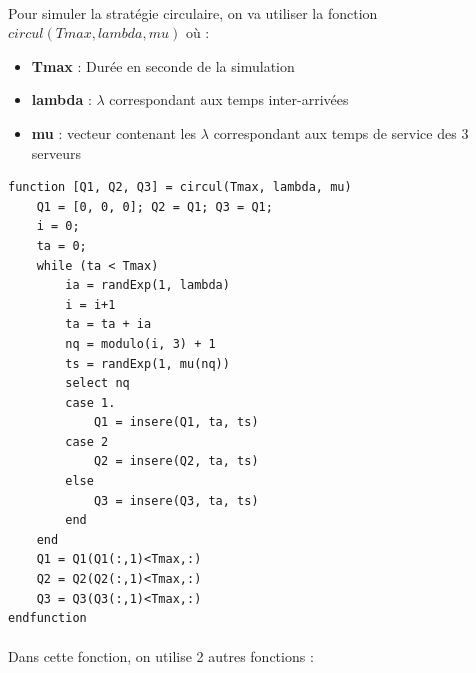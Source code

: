 \documentclass{article}
\begin{document}
\paragraph{}
Pour simuler la stratégie circulaire, on va utiliser la fonction $circul(Tmax,lambda,mu)$ où :
\begin{itemize}
	\item \textbf{Tmax} : Durée en seconde de la simulation
	\item \textbf{lambda} : $\lambda$ correspondant aux temps inter-arrivées
	\item \textbf{mu} : vecteur contenant les $\lambda$ correspondant aux temps de service des 3 serveurs
\end{itemize}
\begin{verbatim}
function [Q1, Q2, Q3] = circul(Tmax, lambda, mu)
    Q1 = [0, 0, 0]; Q2 = Q1; Q3 = Q1;
    i = 0; 
    ta = 0; 
    while (ta < Tmax)
        ia = randExp(1, lambda) 
        i = i+1 
        ta = ta + ia
        nq = modulo(i, 3) + 1
        ts = randExp(1, mu(nq))
        select nq 
        case 1.
            Q1 = insere(Q1, ta, ts)
        case 2 
            Q2 = insere(Q2, ta, ts)
        else
            Q3 = insere(Q3, ta, ts)
        end
    end
    Q1 = Q1(Q1(:,1)<Tmax,:)
    Q2 = Q2(Q2(:,1)<Tmax,:) 
    Q3 = Q3(Q3(:,1)<Tmax,:) 
endfunction 
\end{verbatim}

\paragraph{}
Dans cette fonction, on utilise 2 autres fonctions : 

\end{document}
